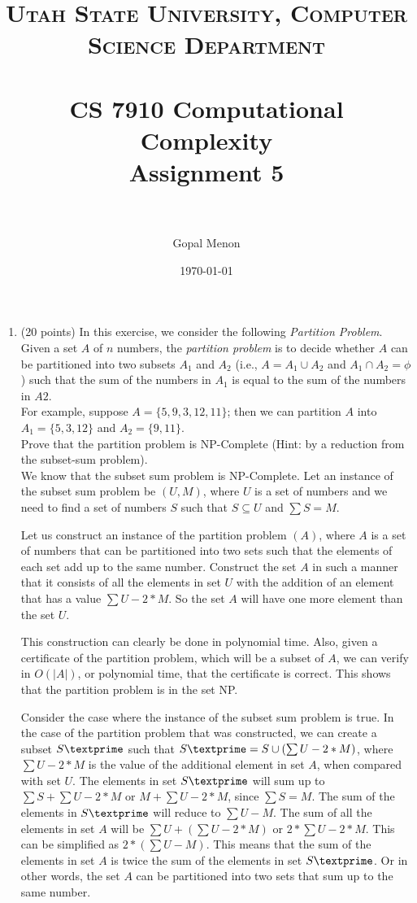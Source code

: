 \documentclass[paper=a4, fontsize=11pt]{scrartcl} %
\title{	
\normalfont \normalsize 
\textsc{Utah State University, Computer Science Department} \\ [25pt] %
\horrule{0.5pt} \\[0.4cm] %
\huge CS 7910 Computational Complexity\\Assignment 5 \\ %
\horrule{2pt} \\[0.5cm] %
}
\author{Gopal Menon} %
\date{\normalsize\today} %
\numberwithin{equation}{section} %
\numberwithin{figure}{section} %
\numberwithin{table}{section} %
\begin{document}
\maketitle %

\begin{enumerate}
\item (20 points) In this exercise, we consider the following \emph{Partition Problem}.\\
Given a set $A$ of $n$ numbers, the \emph{partition problem} is to decide whether $A$ can be partitioned into two subsets $A_1$ and $A_2$ (i.e., $A=A_1 \cup A_2$ and $A_1 \cap A_2 = \phi$) such that the sum of the numbers in $A_1$ is equal to the sum of the numbers in $A2$.\\
For example, suppose $A = \{5, 9, 3, 12, 11\}$; then we can partition $A$ into $A_1 = \{5, 3, 12\}$ and $A_2 = \{9, 11\}$.\\
Prove that the partition problem is NP-Complete (Hint: by a reduction from the subset-sum problem).\\

We know that the subset sum problem is NP-Complete. Let an instance of the subset sum problem be $(U, M)$, where $U$ is a set of numbers and we need to find a set of numbers $S$ such that $S \subseteq U$ and $\sum S = M$.

Let us construct an instance of the partition problem $(A)$, where $A$ is a set of numbers that can be partitioned into two sets such that the elements of each set add up to the same number. Construct the set $A$ in such a manner that it consists of all the elements in set $U$ with the addition of an element that has a value $\sum U - 2*M$. So the set $A$ will have one more element than the set $U$.

This construction can clearly be done in polynomial time. Also, given a certificate of the partition problem, which will be a subset of $A$, we can verify in $O(\left | A \right|)$, or polynomial time, that the certificate is correct. This shows that the partition problem is in the set NP. 

Consider the case where the instance of the subset sum problem is true. In the case of the partition problem that was constructed, we can create a subset $S\textprime$ such that $S\textprime = S \cup (\sum U - 2*M)$, where $\sum U - 2*M$ is the value of the additional element in set $A$, when compared with set $U$. The elements in set $S\textprime$ will sum up to $\sum S + \sum U - 2*M$ or $M + \sum U - 2*M$, since $\sum S = M$. The sum of the elements in $S\textprime$ will reduce to $\sum U - M$. The sum of all the elements in set $A$ will be $\sum U + (\sum U - 2*M)$ or $2 * \sum U - 2*M$. This can be simplified as $2*(\sum U - M)$. This means that the sum of the elements in set $A$ is twice the sum of the elements in set $S\textprime$. Or in other words, the set $A$ can be partitioned into two sets that sum up to the same number.


\end{enumerate}
\end{document}
